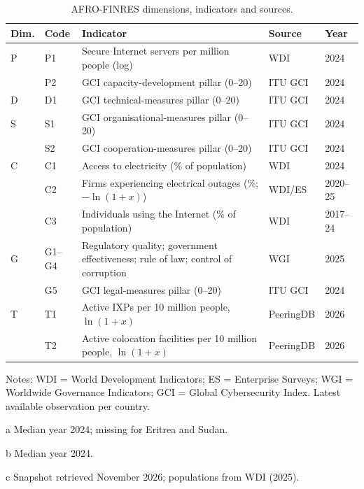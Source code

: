 \documentclass[fintech,article,submit,pdftex,moreauthors]{Definitions/mdpi}
\begin{document}
\begin{table}[H]
\centering
\caption{AFRO-FINRES dimensions, indicators and sources.}
\label{tab:ind}
\small
\begin{threeparttable}
\begin{tabularx}{\textwidth}{l l Y l l}
\toprule
Dim. & Code & Indicator & Source & Year \\
\midrule
P & P1 & Secure Internet servers per million people (log) & WDI & 2024 \\
  & P2 & GCI capacity-development pillar (0--20) & ITU GCI & 2024 \\
D & D1 & GCI technical-measures pillar (0--20) & ITU GCI & 2024 \\
S & S1 & GCI organisational-measures pillar (0--20) & ITU GCI & 2024 \\
  & S2 & GCI cooperation-measures pillar (0--20) & ITU GCI & 2024 \\
C & C1 & Access to electricity (\% of population) & WDI & 2024 \\
  & C2 & Firms experiencing electrical outages (\%; $-\ln(1+x)$) & WDI/ES & 2020--25 \\
  & C3 & Individuals using the Internet (\% of population) & WDI & 2017--24 \\
G & G1--G4 & Regulatory quality; government effectiveness; rule of law; control of corruption & WGI & 2025 \\
  & G5 & GCI legal-measures pillar (0--20) & ITU GCI & 2024 \\
T & T1 & Active IXPs per 10 million people, $\ln(1+x)$ & PeeringDB & 2026 \\
  & T2 & Active colocation facilities per 10 million people, $\ln(1+x)$ & PeeringDB & 2026 \\
\bottomrule
\end{tabularx}
\begin{tablenotes}\footnotesize
\item Notes: WDI = World Development Indicators; ES = Enterprise Surveys; WGI = Worldwide Governance Indicators; GCI = Global Cybersecurity Index. Latest available observation per country.
\item[a] Median year 2024; missing for Eritrea and Sudan. \item[b] Median year 2024. \item[c] Snapshot retrieved November 2026; populations from WDI (2025).
\end{tablenotes}
\end{threeparttable}
\end{table}
\end{document}
